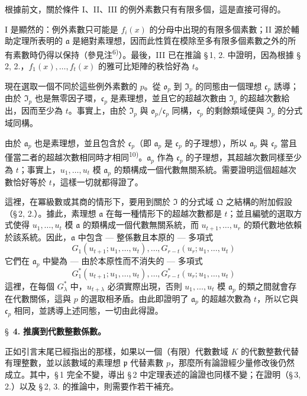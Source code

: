 \documentclass[11pt]{article}
\begin{document}
根據前文，關於條件 I、II、III 的例外素數只有有限多個，這是直接可得的。

I 是顯然的：例外素數只可能是 $f_i(x)$ 的分母中出現的有限多個素數；II 源於輔助定理所表明的 $\mathfrak{a}$ 是絕對素理想，因而此性質在模除至多有限多個素數之外的所有素數時仍得以保持（參見注\textsuperscript{6)}）。最後，III 已在推論 \S\,1, 2. 中證明，因為根據 \S\,2, 2.，$f_1(x),\ldots,f_t(x)$ 的雅可比矩陣的秩恰好為 $t$。

現在選取一個不同於這些例外素數的 $p$。從 $\mathfrak{o}_p$ 到 $\mathfrak{I}_p$ 的同態由一個理想 $\mathfrak{c}_p$ 誘導；由於 $\mathfrak{I}_p$ 也是無零因子環，$\mathfrak{c}_p$ 是素理想，並且它的超越次數由 $\mathfrak{I}_p$ 的超越次數給出，因而至少為 $t$。事實上，由於 $\mathfrak{I}_p$ 與 $\mathfrak{o}_p/\mathfrak{c}_p$ 同構，$\mathfrak{c}_p$ 的剩餘類域便與 $\mathfrak{I}_p$ 的分式域同構。

由於 $\mathfrak{a}_p$ 也是素理想，並且包含於 $\mathfrak{c}_p$（即 $\mathfrak{a}_p$ 是 $\mathfrak{c}_p$ 的子理想），所以 $\mathfrak{a}_p$ 與 $\mathfrak{c}_p$ 當且僅當二者的超越次數相同時才相同\textsuperscript{10)}。$\mathfrak{a}_p$ 作為 $\mathfrak{c}_p$ 的子理想，其超越次數同樣至少為 $t$；事實上，$u_1,\ldots,u_t$ 模 $\mathfrak{a}_p$ 的類構成一個代數無關系統。需要證明這個超越次數恰好等於 $t$，這樣一切就都得證了。

這裡，在冪級數或其商的情形下，要用到關於 $\mathfrak{I}$ 的分式域 $\mathfrak{Q}$ 之結構的附加假設（\S\,2, 2.）。據此，素理想 $\mathfrak{a}$ 在每一種情形下的超越次數都是 $t$；並且編號的選取方式使得 $u_1,\ldots,u_t$ 模 $\mathfrak{a}$ 的類構成一個代數無關系統，而 $u_{t+1},\ldots,u_r$ 的類代數地依賴於該系統。因此，$\mathfrak{a}$ 中包含 --- 整係數且本原的 --- 多項式
\[
G_1(u_{t+1};u_1,\ldots,u_t),\ldots,G_{r-t}(u_r;u_1,\ldots,u_t)\tag{1}
\]
它們在 $\mathfrak{a}_p$ 中變為 --- 由於本原性而不消失的 --- 多項式
\[
G^*_1(u_{t+1};u_1,\ldots,u_t),\ldots,G^*_{r-t}(u_r;u_1,\ldots,u_t)\tag{2}
\]
這裡，在每個 $G^*_\lambda$ 中，$u_{t+\lambda}$ 必須實際出現，否則 $u_1,\ldots,u_t$ 模 $\mathfrak{a}_p$ 的類之間就會存在代數關係，這與 $p$ 的選取相矛盾。由此即證明了 $\mathfrak{a}_p$ 的超越次數為 $t$，所以它與 $\mathfrak{c}_p$ 相同，並誘導上述同態，一切由此得證。

\bigskip
\S~\textbf{4.}
\textbf{推廣到代數整數係數。}

\smallskip

\noindent
正如引言末尾已經指出的那樣，如果以一個（有限）代數數域 $K$ 的代數整數代替有理整數，並以該數域的素理想 $\mathfrak{p}$ 代替素數 $p$，那麼所有論證經少量修改後仍然成立。其中，\S\,1 完全不變，導出 \S\,2 中定理表述的論證也同樣不變；在證明（\S\,3, 2.）以及 \S\,2, 3. 的推論中，則需要作若干補充。
\end{document}
